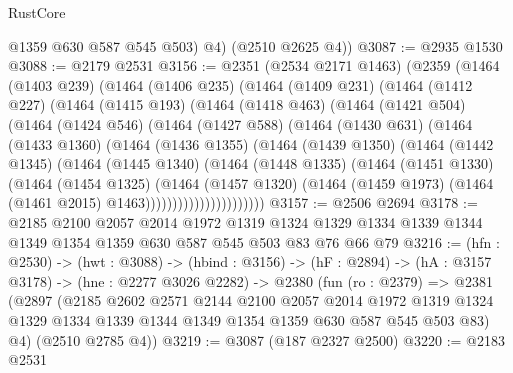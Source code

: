 \begin{lexlean}{RustCore}
\begin{coremodule}
          @1359
          @630
          @587
          @545
          @503)
        @4)
      (@2510 @2625 @4))
@3087 := @2935 @1530
@3088 := @2179 @2531
@3156 := @2351
    (@2534 @2171 @1463)
    (@2359
      (@1464
        (@1403 @239)
        (@1464
          (@1406 @235)
          (@1464
            (@1409 @231)
            (@1464
              (@1412 @227)
              (@1464
                (@1415 @193)
                (@1464
                  (@1418 @463)
                  (@1464
                    (@1421 @504)
                    (@1464
                      (@1424 @546)
                      (@1464
                        (@1427 @588)
                        (@1464
                          (@1430 @631)
                          (@1464
                            (@1433 @1360)
                            (@1464
                              (@1436 @1355)
                              (@1464
                                (@1439 @1350)
                                (@1464
                                  (@1442 @1345)
                                  (@1464
                                    (@1445 @1340)
                                    (@1464
                                      (@1448 @1335)
                                      (@1464
                                        (@1451 @1330)
                                        (@1464
                                          (@1454 @1325)
                                          (@1464
                                            (@1457 @1320)
                                            (@1464
                                              (@1459 @1973)
                                              (@1464 (@1461 @2015) @1463))))))))))))))))))))))
@3157 := @2506 @2694
@3178 := @2185
    @2100
    @2057
    @2014
    @1972
    @1319
    @1324
    @1329
    @1334
    @1339
    @1344
    @1349
    @1354
    @1359
    @630
    @587
    @545
    @503
    @83
    @76
    @66
    @79
@3216 := (hfn : @2530) ->
  (hwt : @3088) ->
  (hbind : @3156) ->
  (hF : @2894) ->
  (hA : @3157 @3178) ->
  (hne : @2277 @3026 @2282) ->
  @2380
    (fun (ro : @2379) =>
    @2381
      (@2897
        (@2185
          @2602
          @2571
          @2144
          @2100
          @2057
          @2014
          @1972
          @1319
          @1324
          @1329
          @1334
          @1339
          @1344
          @1349
          @1354
          @1359
          @630
          @587
          @545
          @503
          @83)
        @4)
      (@2510 @2785 @4))
@3219 := @3087 (@187 @2327 @2500)
@3220 := @2183 @2531

\end{coremodule}
\end{lexlean}
